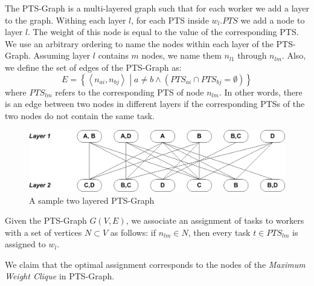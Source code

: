The PTS-Graph is a multi-layered graph such that for each worker we add a layer to the graph. Withing each layer $l$, for each PTS inside $w_l.PTS$ we add a node to layer $l$. The weight of this node is equal to the value of the corresponding PTS. We use an arbitrary ordering to name the nodes within each layer of the PTS-Graph. Assuming layer $l$ contains $m$ nodes, we name them $n_{l1}$ through $n_{lm}$. Also, we define the set of edges of the PTS-Graph as:
\begin{equation*}
E = \left\{ \left\langle n_{ai}, n_{bj} \right\rangle \middle | a \neq b \land \left(PTS_{ai} \cap PTS_{bj} = \emptyset \right) \right\}
\end{equation*}
where $PTS_{lm}$ refers to the corresponding PTS of node $n_{lm}$. In other words, there is an edge between two nodes in different layers if the corresponding PTSs of the two nodes do not contain the same task.

\begin{figure}[t]
	\centering
	\includegraphics[width = 0.85\columnwidth]{figures/PTS_graph.png}
			\vspace{-0.2cm}
	\caption{A sample two layered PTS-Graph}
	\label{fig:PTS_tree}
			\vspace{-0.2cm}
\end{figure}

Given the PTS-Graph $G(V, E)$, we associate an assignment of tasks to workers with a set of vertices $N \subset V$ as follows: if $n_{lm} \in N$, then every task $t \in PTS_{lm}$ is assigned to $w_l$.



We claim that the optimal assignment corresponds to the nodes of the \textit{Maximum Weight Clique} in PTS-Graph.

